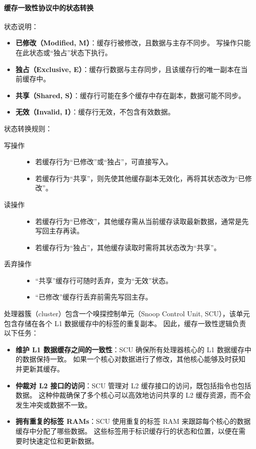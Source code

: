 \paragraph*{缓存一致性协议中的状态转换}

状态说明：

\begin{itemize}
\item
  \textbf{已修改（Modified, M）}：缓存行被修改，且数据与主存不同步。
  写操作只能在此状态或“独占”状态下执行。
\item
  \textbf{独占（Exclusive, E）}：缓存行数据与主存同步，且该缓存行的唯一副本在当前缓存中。
\item
  \textbf{共享（Shared, S）}：缓存行可能在多个缓存中存在副本，数据可能不同步。
\item
  \textbf{无效（Invalid, I）}：缓存行无效，不包含有效数据。
\end{itemize}

状态转换规则：

\begin{description}
\item [{写操作}] \hfill
  \begin{itemize}
  \item
    若缓存行为“已修改”或“独占”，可直接写入。
  \item
    若缓存行为“共享”，则先使其他缓存副本无效化，再将其状态改为“已修改”。
  \end{itemize}
\item
  [{读操作}] \hfill
  \begin{itemize}
  \item
    若缓存行为“已修改”，其他缓存需从当前缓存读取最新数据，通常是先写回主存再读。
  \item
    若缓存行为“独占”，其他缓存读取时需将其状态改为“共享”。
  \end{itemize}
\item [{丢弃操作}] \hfill
  \begin{itemize}
  \item
    “共享”缓存行可随时丢弃，变为“无效”状态。
  \item
    “已修改”缓存行丢弃前需先写回主存。
  \end{itemize}
\end{description}

处理器簇（cluster）包含一个嗅探控制单元（Snoop Control Unit,
SCU），该单元包含存储在各个 L1 数据缓存中的标签的重复副本。
因此，缓存一致性逻辑负责以下任务：

\begin{itemize}
\item
  \textbf{维护 L1 数据缓存之间的一致性}：SCU 确保所有处理器核心的 L1 数据缓存中的数据保持一致。
  如果一个核心对数据进行了修改，其他核心能够及时获知并更新其缓存。
\item
  \textbf{仲裁对 L2 接口的访问}：SCU 管理对 L2 缓存接口的访问，既包括指令也包括数据。
  这种仲裁确保了多个核心可以高效地访问共享的 L2 缓存资源，而不会发生冲突或数据不一致。
\item
  \textbf{拥有重复的标签 RAMs}：SCU 使用重复的标签 RAM 来跟踪每个核心的数据缓存中分配了哪些数据。
  这些标签用于标识缓存行的状态和位置，以便在需要时快速定位和更新数据。
\end{itemize}

